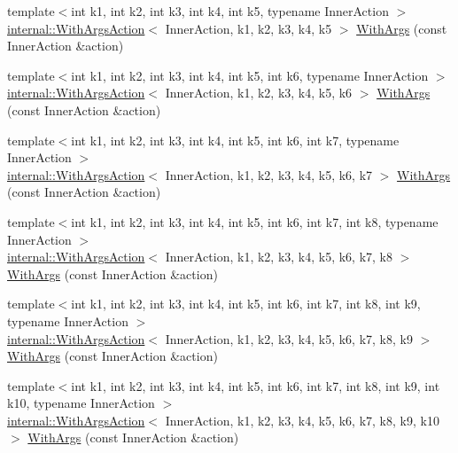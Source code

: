 \begin{DoxyCompactItemize}
\item 
{\footnotesize template$<$int k1, int k2, int k3, int k4, int k5, typename Inner\+Action $>$ }\\\hyperlink{classtesting_1_1internal_1_1WithArgsAction}{internal\+::\+With\+Args\+Action}$<$ Inner\+Action, k1, k2, k3, k4, k5 $>$ \hyperlink{namespacetesting_aa36b0c7216df96bdacf9fe491afd40bd}{With\+Args} (const Inner\+Action \&action)
\item 
{\footnotesize template$<$int k1, int k2, int k3, int k4, int k5, int k6, typename Inner\+Action $>$ }\\\hyperlink{classtesting_1_1internal_1_1WithArgsAction}{internal\+::\+With\+Args\+Action}$<$ Inner\+Action, k1, k2, k3, k4, k5, k6 $>$ \hyperlink{namespacetesting_a6df9cd27659e5943b5d3d77fc4f102e3}{With\+Args} (const Inner\+Action \&action)
\item 
{\footnotesize template$<$int k1, int k2, int k3, int k4, int k5, int k6, int k7, typename Inner\+Action $>$ }\\\hyperlink{classtesting_1_1internal_1_1WithArgsAction}{internal\+::\+With\+Args\+Action}$<$ Inner\+Action, k1, k2, k3, k4, k5, k6, k7 $>$ \hyperlink{namespacetesting_a04146a27847141c6942e9c67a85aadbe}{With\+Args} (const Inner\+Action \&action)
\item 
{\footnotesize template$<$int k1, int k2, int k3, int k4, int k5, int k6, int k7, int k8, typename Inner\+Action $>$ }\\\hyperlink{classtesting_1_1internal_1_1WithArgsAction}{internal\+::\+With\+Args\+Action}$<$ Inner\+Action, k1, k2, k3, k4, k5, k6, k7, k8 $>$ \hyperlink{namespacetesting_a16c131c0d58ae07d2e1ee6c7a44aaad1}{With\+Args} (const Inner\+Action \&action)
\item 
{\footnotesize template$<$int k1, int k2, int k3, int k4, int k5, int k6, int k7, int k8, int k9, typename Inner\+Action $>$ }\\\hyperlink{classtesting_1_1internal_1_1WithArgsAction}{internal\+::\+With\+Args\+Action}$<$ Inner\+Action, k1, k2, k3, k4, k5, k6, k7, k8, k9 $>$ \hyperlink{namespacetesting_a6aec78e6c201b150c78271e3f851414e}{With\+Args} (const Inner\+Action \&action)
\item 
{\footnotesize template$<$int k1, int k2, int k3, int k4, int k5, int k6, int k7, int k8, int k9, int k10, typename Inner\+Action $>$ }\\\hyperlink{classtesting_1_1internal_1_1WithArgsAction}{internal\+::\+With\+Args\+Action}$<$ Inner\+Action, k1, k2, k3, k4, k5, k6, k7, k8, k9, k10 $>$ \hyperlink{namespacetesting_a768a620ad07c6b5822201fa4f15fb4f0}{With\+Args} (const Inner\+Action \&action)

\end{DoxyCompactItemize}
